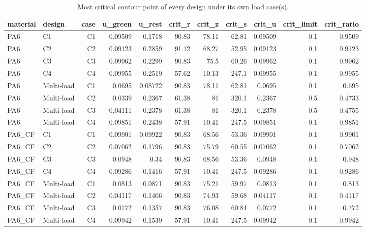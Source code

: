 \begin{table}[htbp]
\centering
\caption{Most critical contour point of every design under its own load case(s).}
\label{tab:T10_07_tolerance_critical_points}
\begin{tabular}{llrrrrrrrrr}
\toprule
material & design & case & u\_green & u\_rest & crit\_r & crit\_z & crit\_s & crit\_u & crit\_limit & crit\_ratio \\
\midrule
PA6 & C1 & C1 & 0.09509 & 0.1718 & 90.83 & 78.11 & 62.81 & 0.09509 & 0.1 & 0.9509 \\
PA6 & C2 & C2 & 0.09123 & 0.2859 & 91.12 & 68.27 & 52.95 & 0.09123 & 0.1 & 0.9123 \\
PA6 & C3 & C3 & 0.09962 & 0.2299 & 90.83 & 75.5 & 60.26 & 0.09962 & 0.1 & 0.9962 \\
PA6 & C4 & C4 & 0.09955 & 0.2519 & 57.62 & 10.13 & 247.1 & 0.09955 & 0.1 & 0.9955 \\
PA6 & Multi-load & C1 & 0.0695 & 0.08722 & 90.83 & 78.11 & 62.81 & 0.0695 & 0.1 & 0.695 \\
PA6 & Multi-load & C2 & 0.0339 & 0.2367 & 61.38 & 81 & 320.1 & 0.2367 & 0.5 & 0.4733 \\
PA6 & Multi-load & C3 & 0.04111 & 0.2378 & 61.38 & 81 & 320.1 & 0.2378 & 0.5 & 0.4755 \\
PA6 & Multi-load & C4 & 0.09851 & 0.2438 & 57.91 & 10.41 & 247.5 & 0.09851 & 0.1 & 0.9851 \\
PA6\_CF & C1 & C1 & 0.09901 & 0.09922 & 90.83 & 68.56 & 53.36 & 0.09901 & 0.1 & 0.9901 \\
PA6\_CF & C2 & C2 & 0.07062 & 0.1796 & 90.83 & 75.79 & 60.55 & 0.07062 & 0.1 & 0.7062 \\
PA6\_CF & C3 & C3 & 0.0948 & 0.34 & 90.83 & 68.56 & 53.36 & 0.0948 & 0.1 & 0.948 \\
PA6\_CF & C4 & C4 & 0.09286 & 0.1416 & 57.91 & 10.41 & 247.5 & 0.09286 & 0.1 & 0.9286 \\
PA6\_CF & Multi-load & C1 & 0.0813 & 0.0871 & 90.83 & 75.21 & 59.97 & 0.0813 & 0.1 & 0.813 \\
PA6\_CF & Multi-load & C2 & 0.04117 & 0.1406 & 90.83 & 74.93 & 59.68 & 0.04117 & 0.1 & 0.4117 \\
PA6\_CF & Multi-load & C3 & 0.0772 & 0.1357 & 90.83 & 76.08 & 60.84 & 0.0772 & 0.1 & 0.772 \\
PA6\_CF & Multi-load & C4 & 0.09942 & 0.1539 & 57.91 & 10.41 & 247.5 & 0.09942 & 0.1 & 0.9942 \\
\bottomrule
\end{tabular}
\end{table}
